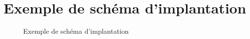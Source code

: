 \section{Exemple de sch\'{e}ma d'implantation}
\begin{figure}[H]
	\centering
	\caption{Exemple de sch\'{e}ma d'implantation}
	\label{schema_implantation}
\end{figure}

% 
